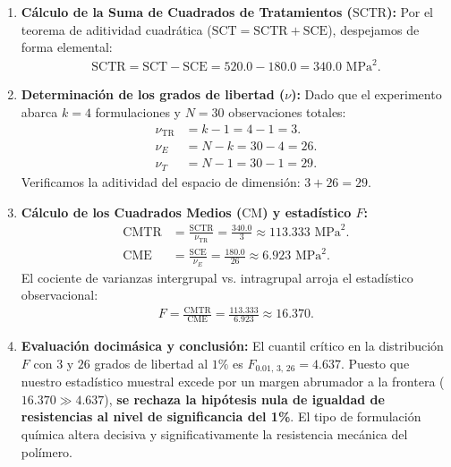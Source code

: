 \begin{solproblema}
	\begin{enumerate}
		\item \textbf{Cálculo de la Suma de Cuadrados de Tratamientos ($\text{SCTR}$):}
		Por el teorema de aditividad cuadrática ($\text{SCT} = \text{SCTR} + \text{SCE}$), despejamos de forma elemental:
		\begin{align}
			\text{SCTR} = \text{SCT} - \text{SCE} = 520.0 - 180.0 = 340.0 \text{ MPa}^2.
		\end{align}
		
		\item \textbf{Determinación de los grados de libertad ($\nu$):}
		Dado que el experimento abarca $k = 4$ formulaciones y $N = 30$ observaciones totales:
		\begin{align}
			\nu_{\text{TR}} &= k - 1 = 4 - 1 = 3. \\
			\nu_E &= N - k = 30 - 4 = 26. \\
			\nu_T &= N - 1 = 30 - 1 = 29.
		\end{align}
		Verificamos la aditividad del espacio de dimensión: $3 + 26 = 29$.
		
		\item \textbf{Cálculo de los Cuadrados Medios ($\text{CM}$) y estadístico $F$:}
		\begin{align}
			\text{CMTR} &= \frac{\text{SCTR}}{\nu_{\text{TR}}} = \frac{340.0}{3} \approx 113.333 \text{ MPa}^2. \\
			\text{CME} &= \frac{\text{SCE}}{\nu_E} = \frac{180.0}{26} \approx 6.923 \text{ MPa}^2.
		\end{align}
		El cociente de varianzas intergrupal vs. intragrupal arroja el estadístico observacional:
		\begin{align}
			F = \frac{\text{CMTR}}{\text{CME}} = \frac{113.333}{6.923} \approx 16.370.
		\end{align}
		
		\item \textbf{Evaluación docimásica y conclusión:}
		El cuantil crítico en la distribución $F$ con $3$ y $26$ grados de libertad al $1\%$ es $F_{0.01, \, 3, \, 26} = 4.637$.
		Puesto que nuestro estadístico muestral excede por un margen abrumador a la frontera ($16.370 \gg 4.637$), \textbf{se rechaza la hipótesis nula de igualdad de resistencias al nivel de significancia del 1\%}. El tipo de formulación química altera decisiva y significativamente la resistencia mecánica del polímero.
	\end{enumerate}
\end{solproblema}

